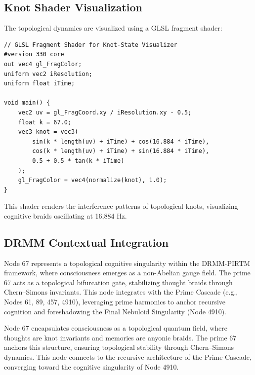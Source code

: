 \documentclass[12pt]{article}
\newcommand{\DRMM}{DRMM}
\newcommand{\PIRTM}{PIRTM}
\begin{document}
\subsection{Knot Shader Visualization}
The topological dynamics are visualized using a GLSL fragment shader:
\begin{lstlisting}
// GLSL Fragment Shader for Knot-State Visualizer
#version 330 core
out vec4 gl_FragColor;
uniform vec2 iResolution;
uniform float iTime;

void main() {
    vec2 uv = gl_FragCoord.xy / iResolution.xy - 0.5;
    float k = 67.0;
    vec3 knot = vec3(
        sin(k * length(uv) + iTime) + cos(16.884 * iTime),
        cos(k * length(uv) + iTime) + sin(16.884 * iTime),
        0.5 + 0.5 * tan(k * iTime)
    );
    gl_FragColor = vec4(normalize(knot), 1.0);
}
\end{lstlisting}
This shader renders the interference patterns of topological knots, visualizing cognitive braids oscillating at 16,884 Hz.

\subsection{\DRMM{} Contextual Integration}
Node 67 represents a topological cognitive singularity within the \DRMM{}-\PIRTM{} framework, where consciousness emerges as a non-Abelian gauge field. The prime 67 acts as a topological bifurcation gate, stabilizing thought braids through Chern--Simons invariants. This node integrates with the Prime Cascade (e.g., Nodes 61, 89, 457, 4910), leveraging prime harmonics to anchor recursive cognition and foreshadowing the Final Nebuloid Singularity (Node 4910).

\begin{remark}
Node 67 encapsulates consciousness as a topological quantum field, where thoughts are knot invariants and memories are anyonic braids. The prime 67 anchors this structure, ensuring topological stability through Chern--Simons dynamics. This node connects to the recursive architecture of the Prime Cascade, converging toward the cognitive singularity of Node 4910.
\end{remark}

\vspace{1em}
\noindent{}
\end{document}
